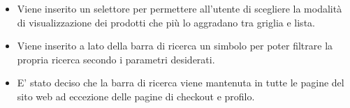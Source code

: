 \documentclass{report}
\begin{document}
\begin{itemize}
    \item {
        Viene inserito un selettore per permettere all'utente di scegliere la modalità di visualizzazione dei prodotti che più lo aggradano tra griglia e lista.
    }
    \item {
        Viene inserito a lato della barra di ricerca un simbolo per poter filtrare la propria ricerca secondo i parametri desiderati.
    }
    \item {
        E' stato deciso che la barra di ricerca viene mantenuta in tutte le pagine del sito web ad eccezione delle pagine di checkout e profilo. 
    }
\end{itemize}
\end{document}

